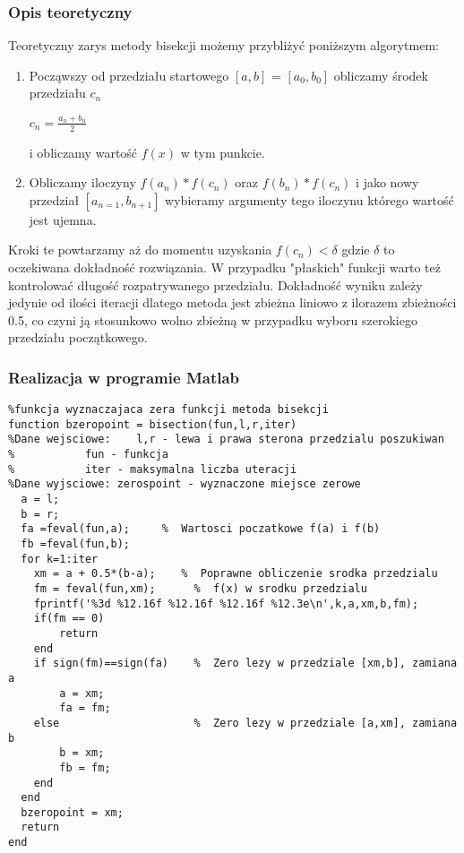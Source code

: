 \documentclass[a4paper, 11pt]{article}
\begin{document}
\subsubsection{Opis teoretyczny}
Teoretyczny zarys metody bisekcji możemy przybliżyć poniższym algorytmem:
\begin{enumerate}
  \item Począwszy od przedziału startowego $[a,b]$ = $[a_{0},b_{0}]$ obliczamy środek przedziału $c_{n}$\\
  	\begin{center}
  	$c_{n} = \frac{a_{n}+b_{n}}{2}$\\
	\end{center}
  i obliczamy wartość $f(x)$ w tym punkcie. 
  \item Obliczamy iloczyny $f(a_{n})*f(c_{n})$ oraz $f(b_{n})*f(c_{n})$ i jako nowy przedział $[a_{n=1},b_{n+1}]$
  wybieramy argumenty tego iloczynu którego wartość jest ujemna. 
\end{enumerate} 
Kroki te powtarzamy aż do momentu uzyskania $f(c_{n})<\delta$ gdzie $\delta$ to oczekiwana dokładność rozwiązania. W przypadku "płaskich"  funkcji warto też kontrolować długość rozpatrywanego przedziału. 
Dokładność wyniku zależy jedynie od ilości iteracji dlatego metoda jest zbieżna liniowo z ilorazem zbieżności 0.5, co czyni ją stosunkowo wolno zbieżną w przypadku wyboru szerokiego przedziału początkowego. 



\subsubsection{Realizacja w programie Matlab}
\begin{lstlisting}
%funkcja wyznaczajaca zera funkcji metoda bisekcji
function bzeropoint = bisection(fun,l,r,iter)
%Dane wejsciowe:	l,r - lewa i prawa sterona przedzialu poszukiwan
%			fun - funkcja 
%			iter - maksymalna liczba uteracji
%Dane wyjsciowe: zerospoint - wyznaczone miejsce zerowe
  a = l; 
  b = r;
  fa =feval(fun,a);     %  Wartosci poczatkowe f(a) i f(b)
  fb =feval(fun,b);
  for k=1:iter
    xm = a + 0.5*(b-a);    %  Poprawne obliczenie srodka przedzialu
    fm = feval(fun,xm);      %  f(x) w srodku przedzialu
    fprintf('%3d %12.16f %12.16f %12.16f %12.3e\n',k,a,xm,b,fm);
    if(fm == 0)
        return
    end
    if sign(fm)==sign(fa)    %  Zero lezy w przedziale [xm,b], zamiana a
        a = xm;
        fa = fm;
    else                     %  Zero lezy w przedziale [a,xm], zamiana b
        b = xm;
        fb = fm;
    end
  end
  bzeropoint = xm; 
  return
end
\end{lstlisting}
\end{document}
